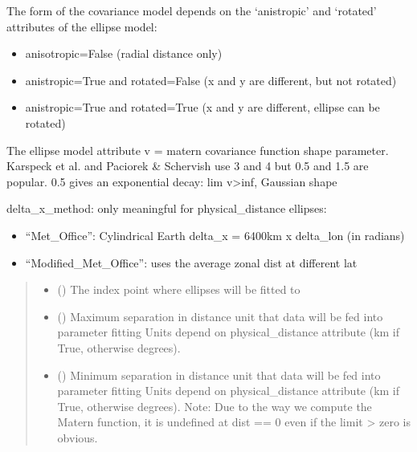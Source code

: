 \documentclass[letterpaper,10pt,english]{sphinxmanual}
\begin{document}
\begin{fulllineitems}
\begin{fulllineitems}
\sphinxAtStartPar
The form of the covariance model depends on the ‘anistropic’ and
‘rotated’ attributes of the ellipse model:
\begin{itemize}
\item {}
\sphinxAtStartPar
anisotropic=False (radial distance only)

\item {}
\sphinxAtStartPar
anistropic=True and rotated=False (x and y are different, but not
rotated)

\item {}
\sphinxAtStartPar
anistropic=True and rotated=True (x and y are different, ellipse can
be rotated)

\end{itemize}

\sphinxAtStartPar
The ellipse model attribute v = matern covariance function shape
parameter.
Karspeck et al.  and Paciorek \& Schervish
use 3 and 4 but 0.5 and 1.5 are popular. 0.5 gives an exponential decay:
lim v\textendash{}\textgreater{}inf, Gaussian shape

\sphinxAtStartPar
delta\_x\_method: only meaningful for physical\_distance ellipses:
\begin{itemize}
\item {}
\sphinxAtStartPar
“Met\_Office”: Cylindrical Earth delta\_x = 6400km x delta\_lon
(in radians)

\item {}
\sphinxAtStartPar
“Modified\_Met\_Office”: uses the average zonal dist at different
lat

\end{itemize}
\begin{quote}\begin{description}
\begin{itemize}
\item {}
\sphinxAtStartPar
{} () \textendash{} The index point where ellipses will be fitted to

\item {}
\sphinxAtStartPar
{} () \textendash{} Maximum separation in distance unit that data will be fed
into parameter fitting
Units depend on physical\_distance attribute (km if True, otherwise
degrees).

\item {}
\sphinxAtStartPar
{} () \textendash{} Minimum separation in distance unit that data
will be fed into parameter fitting
Units depend on physical\_distance attribute (km if True, otherwise
degrees).
Note: Due to the way we compute the Matern function,
it is undefined at dist == 0 even if the limit \sphinxhyphen{}\textgreater{} zero is obvious.


\end{itemize}
\end{description}
\end{quote}
\end{fulllineitems}
\end{fulllineitems}
\end{document}
